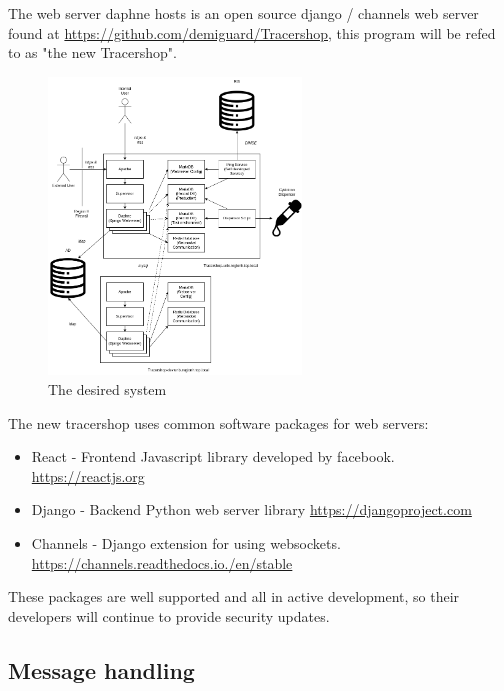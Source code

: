 \documentclass{article}
\begin{document}
The web server daphne hosts is an open source django / channels web server found at \url{https://github.com/demiguard/Tracershop}, this program will be refed to as "the new Tracershop".

\begin{figure}[ht]
  \begin{center}
    \includegraphics[width=0.6\textwidth]{figures/TracershopSystemOverview.png}
  \end{center}
  \caption{The desired system}
  \label{fig:TSO}
\end{figure}

The new tracershop uses common software packages for web servers:
\begin{itemize}
  \item React - Frontend Javascript library developed by facebook. \url{https://reactjs.org}
  \item Django - Backend Python web server library \url{https://djangoproject.com}
  \item Channels - Django extension for using websockets. \url{https://channels.readthedocs.io./en/stable}
\end{itemize}
These packages are well supported and all in active development, so their developers will continue to provide security updates.

\subsection*{Message handling}
\end{document}
